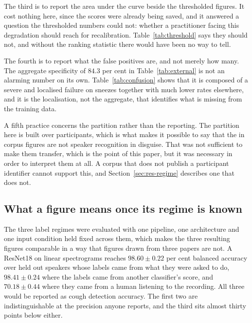 The third is to report the area under the curve beside the thresholded figures. It cost
nothing here, since the scores were already being saved, and it answered a question the
thresholded numbers could not: whether a practitioner facing this degradation should
reach for recalibration. Table~\ref{tab:threshold} says they should not, and without the
ranking statistic there would have been no way to tell.

The fourth is to report what the false positives are, and not merely how many. The
aggregate specificity of $84.3$ per cent in Table~\ref{tab:external} is not an alarming
number on its own. Table~\ref{tab:confusion} shows that it is composed of a severe and
localised failure on sneezes together with much lower rates elsewhere, and it is the
localisation, not the aggregate, that identifies what is missing from the training data.

A fifth practice concerns the partition rather than the reporting. The partition here is
built over participants, which is what makes it possible to say that the in corpus figures
are not speaker recognition in disguise. That was not sufficient to make them transfer,
which is the point of this paper, but it was necessary in order to interpret them at all.
A corpus that does not publish a participant identifier cannot support this, and
Section~\ref{sec:res-regime} describes one that does not.

\subsection{What a figure means once its regime is known}\label{sec:disc-regime}

The three label regimes were evaluated with one pipeline, one architecture and one input
condition held fixed across them, which makes the three resulting figures comparable in a
way that figures drawn from three papers are not. A ResNet18 on linear spectrograms
reaches $98.60 \pm 0.22$ per cent balanced accuracy over held out speakers whose labels
came from what they were asked to do, $98.41 \pm 0.24$ where the labels came from another
classifier's score, and $70.18 \pm 0.44$ where they came from a human listening to the
recording. All three would be reported as cough detection accuracy. The first two are
indistinguishable at the precision anyone reports, and the third sits almost thirty points
below either.


